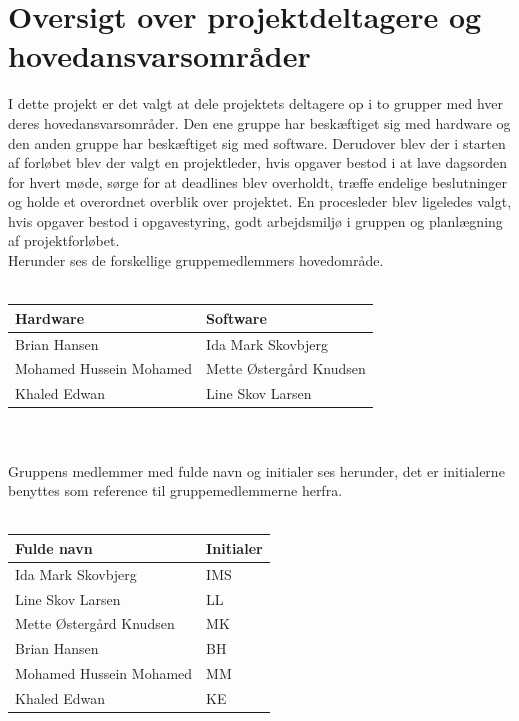 \section{Oversigt over projektdeltagere og hovedansvarsområder}
I dette projekt er det valgt at dele projektets deltagere op i to grupper med hver deres hovedansvarsområder. Den ene gruppe har beskæftiget sig med hardware og den anden gruppe har beskæftiget sig med software. Derudover blev der i starten af forløbet blev der valgt en projektleder, hvis opgaver bestod i at lave dagsorden for hvert møde, sørge for at deadlines blev overholdt, træffe endelige beslutninger og holde et overordnet overblik over projektet. En procesleder blev ligeledes valgt, hvis opgaver bestod i opgavestyring, godt arbejdsmiljø i gruppen og planlægning af projektforløbet. \\
Herunder ses de forskellige gruppemedlemmers hovedområde.\\\\
\begin{tabular}{| l | l |} \hline
\textbf{Hardware} & \textbf{Software}\\\hline
Brian Hansen & Ida Mark Skovbjerg \\\hline 
Mohamed Hussein Mohamed & Mette Østergård Knudsen \\\hline
Khaled Edwan & Line Skov Larsen  \\\hline 
\end{tabular}
\\\\
Gruppens medlemmer med fulde navn og initialer ses herunder, det er initialerne benyttes som reference til gruppemedlemmerne herfra. \\\\
\begin{tabular}{| l | l |} \hline
\textbf{Fulde navn} & \textbf{Initialer}\\\hline
Ida Mark Skovbjerg & IMS \\\hline 
Line Skov Larsen & LL \\\hline
Mette Østergård Knudsen & MK  \\\hline 
Brian Hansen & BH \\\hline
Mohamed Hussein Mohamed & MM \\\hline 
Khaled Edwan & KE \\\hline
\end{tabular}
